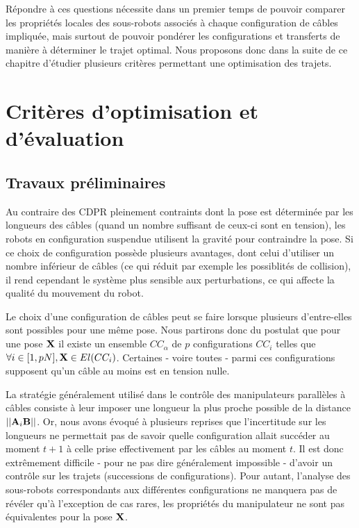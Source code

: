 R\'epondre \`a ces questions n\'ecessite dans un premier temps de 
pouvoir comparer les propri\'et\'es locales des sous-robots associ\'es \`a 
chaque configuration de c\^ables impliqu\'ee, mais surtout de pouvoir 
pond\'erer les configurations et transferts de mani\`ere \`a d\'eterminer le 
trajet optimal. Nous proposons donc dans la suite de ce chapitre d'\'etudier 
plusieurs crit\`eres permettant une optimisation des trajets.

\section{Crit\`eres d'optimisation et d'\'evaluation}

\subsection{Travaux pr\'eliminaires}

Au contraire des CDPR pleinement contraints dont la pose est d\'etermin\'ee par 
les longueurs des c\^ables (quand un nombre suffisant de ceux-ci sont en 
tension), les robots en configuration suspendue utilisent la gravit\'e pour 
contraindre la pose. Si ce choix de configuration poss\`ede plusieurs 
avantages, dont celui d'utiliser un nombre inf\'erieur de c\^ables (ce qui 
r\'eduit par exemple les possiblit\'es de collision), il rend cependant le 
syst\`eme plus sensible aux perturbations, ce qui affecte la qualit\'e du 
mouvement du robot.

Le choix d'une configuration de c\^ables peut se faire lorsque plusieurs 
d'entre-elles sont possibles pour une m\^eme pose. Nous partirons donc du 
postulat que pour une pose ${\bf X}$ il existe un ensemble $CC_\alpha$ de $p$ 
configurations $CC_{i}$ telles que $\forall i \in [1, pN], {\bf X} \in 
El(CC_i)$. Certaines - voire toutes - parmi ces configurations supposent qu'un 
c\^able au moins est en tension nulle.

La strat\'egie g\'en\'eralement utilis\'e dans le contr\^ole des manipulateurs 
parall\`eles \`a c\^ables consiste \`a leur imposer une longueur la plus proche 
possible de la distance $||{\bf A}_i{\bf B}||$. Or, nous avons \'evoqu\'e \`a 
plusieurs reprises que l'incertitude sur les longueurs ne permettait pas de 
savoir quelle configuration allait succ\'eder au moment $t+1$ \`a celle prise 
effectivement par les c\^ables au moment $t$. Il est donc extr\^emement 
difficile - pour ne pas dire g\'en\'eralement impossible - d'avoir un 
contr\^ole sur les trajets (successions de configurations). Pour autant, 
l'analyse des sous-robots correspondants aux diff\'erentes configurations ne 
manquera pas de r\'ev\'eler qu'\`a l'exception de cas rares, les propri\'et\'es 
du manipulateur ne sont pas \'equivalentes pour la pose ${\bf X}$.

